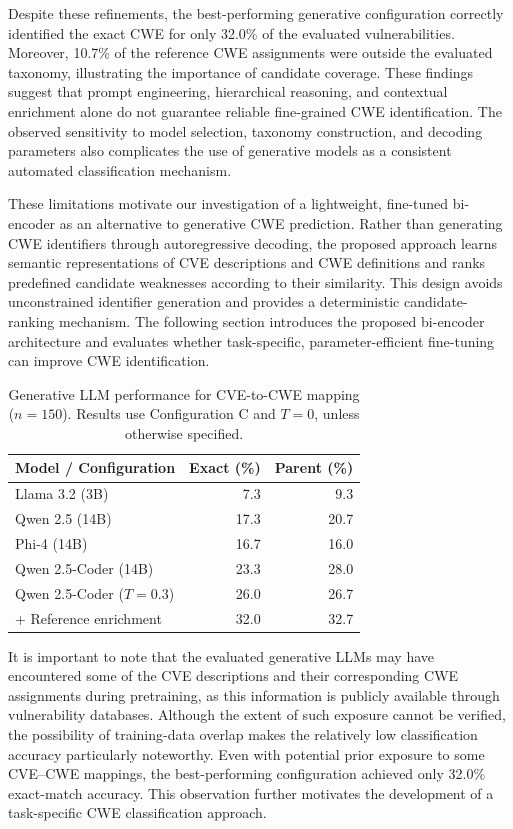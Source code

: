 \documentclass[conference,compsoc]{IEEEtran}
\begin{document}
Despite these refinements, the best-performing
generative configuration correctly identified
the exact CWE for only 32.0\% of the evaluated
vulnerabilities. Moreover, 10.7\% of the
reference CWE assignments were outside the
evaluated taxonomy, illustrating the importance
of candidate coverage. These findings suggest
that prompt engineering, hierarchical reasoning,
and contextual enrichment alone do not guarantee
reliable fine-grained CWE identification.
The observed sensitivity to model selection,
taxonomy construction, and decoding parameters
also complicates the use of generative models
as a consistent automated classification mechanism.

These limitations motivate our investigation of
a lightweight, fine-tuned bi-encoder as an
alternative to generative CWE prediction.
Rather than generating CWE identifiers through
autoregressive decoding, the proposed approach
learns semantic representations of CVE descriptions
and CWE definitions and ranks predefined candidate
weaknesses according to their similarity.
This design avoids unconstrained identifier
generation and provides a deterministic
candidate-ranking mechanism. The following
section introduces the proposed bi-encoder
architecture and evaluates whether task-specific,
parameter-efficient fine-tuning can improve
CWE identification.


\begin{table}[t]
\centering
\caption{Generative LLM performance for CVE-to-CWE
mapping ($n=150$). Results use Configuration C
and $T=0$, unless otherwise specified.}
\label{tab:generative_llm_summary}
\scriptsize
\setlength{\tabcolsep}{3pt}
\begin{tabular}{lrr}
\toprule
\textbf{Model / Configuration}
& \textbf{Exact (\%)}
& \textbf{Parent (\%)} \\
\midrule
Llama 3.2 (3B)        & 7.3  & 9.3 \\
Qwen 2.5 (14B)        & 17.3 & 20.7 \\
Phi-4 (14B)          & 16.7 & 16.0 \\
Qwen 2.5-Coder (14B)  & 23.3 & 28.0 \\
\midrule
Qwen 2.5-Coder ($T=0.3$)
                       & 26.0 & 26.7 \\
+ Reference enrichment & 32.0 & 32.7 \\
\bottomrule
\end{tabular}
\end{table}


It is important to note that the evaluated generative
LLMs may have encountered some of the CVE descriptions
and their corresponding CWE assignments during
pretraining, as this information is publicly available
through vulnerability databases. Although the extent
of such exposure cannot be verified, the possibility
of training-data overlap makes the relatively low
classification accuracy particularly noteworthy.
Even with potential prior exposure to some CVE--CWE
mappings, the best-performing configuration achieved
only 32.0\% exact-match accuracy. This observation
further motivates the development of a task-specific
CWE classification approach.
\end{document}
